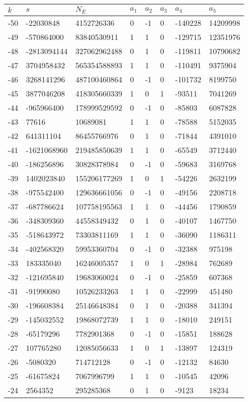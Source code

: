 \documentclass{amsart}
\begin{document}
\begin{longtable}{|l|l|l|lllll|}
\hline
$k$ & $s$ & $N_E$ & $a_1$ & $a_2$ & $a_3$ & $a_4$ & $a_5$\\
\hline
-50&-22030848&4152726336&0&-1&0&-140228&14209998\\
-49&-570864000&83840530911&1&1&0&-129715&12351976\\
-48&-2813094144&327062962488&0&1&0&-119811&10790682\\
-47&3704958432&565354588893&1&1&0&-110491&9375904\\
-46&3268141296&487100460864&0&-1&0&-101732&8199750\\
-45&3877046208&418305660339&1&0&1&-93511&7041269\\
-44&-965966400&178999529592&0&-1&0&-85803&6087828\\
-43&77616&10689081&1&1&0&-78588&5152035\\
-42&641311104&86455766976&0&1&0&-71844&4391010\\
-41&-1621068960&219485850639&1&1&0&-65549&3712440\\
-40&-186256896&30828378984&0&-1&0&-59683&3169768\\
-39&1402023840&155206177269&1&0&1&-54226&2632199\\
-38&-975542400&129636661056&0&-1&0&-49156&2208718\\
-37&-687786624&107758195563&1&1&0&-44456&1790859\\
-36&-348309360&44558349432&0&1&0&-40107&1467750\\
-35&-518643972&73303811169&1&1&0&-36090&1186311\\
-34&-402568320&59953360704&0&-1&0&-32388&975198\\
-33&183335040&16246005357&1&0&1&-28984&762689\\
-32&-121695840&19683060024&0&-1&0&-25859&607368\\
-31&-91990080&10526233263&1&1&0&-22999&451480\\
-30&-196608384&25146648384&0&1&0&-20388&341394\\
-29&-145032552&19868072739&1&1&0&-18010&249151\\
-28&-65179296&7782901368&0&-1&0&-15851&188628\\
-27&107765280&12085056633&1&0&1&-13897&124319\\
-26&-5080320&714712128&0&-1&0&-12132&84630\\
-25&-61675824&7067996799&1&1&0&-10545&42096\\
-24&2564352&295285368&0&1&0&-9123&18234\\

\end{longtable}
\end{document}
